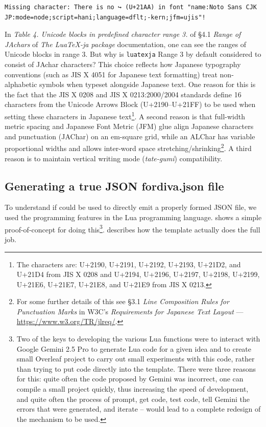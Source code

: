 \documentclass[12pt, twoside]{article}
\begin{document}
\begin{lstlisting}[language={[LaTeX]TeX}, caption={Log message shown in Rightwards Arrow with Hook is missing from the Noto Sans CJK JP font when using \texttt{luatexja}}, label=lst:rightHookMissing] 
Missing character: There is no ↪ (U+21AA) in font "name:Noto Sans CJK JP:mode=node;script=hani;language=dflt;-kern;jfm=ujis"!
\end{lstlisting}

In \textit{Table 4. Unicode blocks in predefined character range 3.} of §4.1 \textit{Range of JAchars} of \textit{The Lua\TeX{}-ja package} documentation, one can see the ranges of Unicode blocks in range 3. But why is \texttt{luatexja} Range 3 by default considered to consist of JAchar characters? This choice reflects how Japanese typography conventions (such as JIS X 4051 for Japanese text formatting) treat non-alphabetic symbols when typeset alongside Japanese text.
One reason for this is the fact that the JIS X 0208 and JIS X 0213:2000/2004 standards define 16 characters from the Unicode Arrows Block (U+2190–U+21FF) to be used when setting these characters in Japanese text\footnote{The characters are: U+2190, U+2191, U+2192, U+2193, U+21D2, and U+21D4 from JIS X 0208 and U+2194, U+2196, U+2197, U+2198, U+2199, U+21E6, U+21E7, U+21E8, and U+21E9 from JIS X 0213.}. A second reason is that full-width metric spacing and Japanese Font Metric (JFM) glue align Japanese characters and punctuation (JAChar) on an em-square grid, while an ALChar has variable proportional widths and allows inter-word space stretching/shrinking\footnote{For some further details of this see §3.1 \textit{Line Composition Rules for Punctuation Marks} in W3C's \textit{Requirements for Japanese Text Layout} --- \url{https://www.w3.org/TR/jlreq/}.}. A third reason is to maintain vertical writing mode (\ie \textit{tate-gumi}) compatibility.

\subsection{Generating a true JSON fordiva.json file}
\label{sec:avoidCleanup}

To understand if \LuaLaTeX{} could be used to directly emit a properly formed \gls{JSON} file, we used the programming features in the Lua programming language.  shows a simple proof-of-concept for doing this\footnote{Two of the keys to developing the various Lua functions were \first to interact with Google Gemini 2.5 Pro to generate Lua code for a given idea and \Second to create small Overleaf project to carry out small experiments with this code, rather than trying to put code directly into the template. There were three reasons for this: \first quite often the code proposed by Gemini was incorrect, \Second one can compile a small project quickly, thus increasing the speed of development, and \third quite often the process of prompt, get code, test code, tell Gemini the errors that were generated, and iterate -- would lead to a complete redesign of the mechanism to be used.}.  describes how the template actually does the full job.
\end{document}
